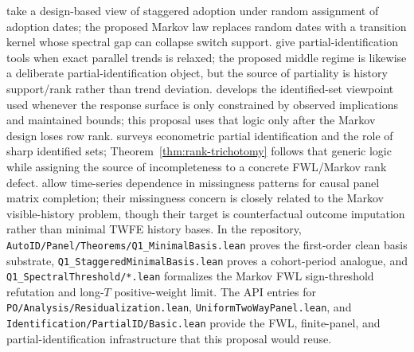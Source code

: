 \documentclass[11pt]{article}
\theoremstyle{definition}
\theoremstyle{plain}
\theoremstyle{remark}
\begin{document}
\citet{athey2022design} take a design-based view of staggered adoption under random assignment of adoption dates; the proposed Markov law replaces random dates with a transition kernel whose spectral gap can collapse switch support.
\citet{rambachan2023parallel} give partial-identification tools when exact parallel trends is relaxed; the proposed middle regime is likewise a deliberate partial-identification object, but the source of partiality is history support/rank rather than trend deviation.
\citet{manski2003partial} develops the identified-set viewpoint used whenever the response surface is only constrained by observed implications and maintained bounds; this proposal uses that logic only after the Markov design loses row rank.
\citet{tamer2010partial} surveys econometric partial identification and the role of sharp identified sets; Theorem~\ref{thm:rank-trichotomy} follows that generic logic while assigning the source of incompleteness to a concrete FWL/Markov rank defect.
\citet{athey2021matrix} allow time-series dependence in missingness patterns for causal panel matrix completion; their missingness concern is closely related to the Markov visible-history problem, though their target is counterfactual outcome imputation rather than minimal TWFE history bases.
In the repository, \texttt{AutoID/Panel/Theorems/Q1\_MinimalBasis.lean} proves the first-order clean basis substrate, \texttt{Q1\_StaggeredMinimalBasis.lean} proves a cohort-period analogue, and \texttt{Q1\_SpectralThreshold/*.lean} formalizes the Markov FWL sign-threshold refutation and long-\(T\) positive-weight limit.
The API entries for \texttt{PO/Analysis/Residualization.lean}, \texttt{UniformTwoWayPanel.lean}, and \texttt{Identification/PartialID/Basic.lean} provide the FWL, finite-panel, and partial-identification infrastructure that this proposal would reuse.
\end{document}
